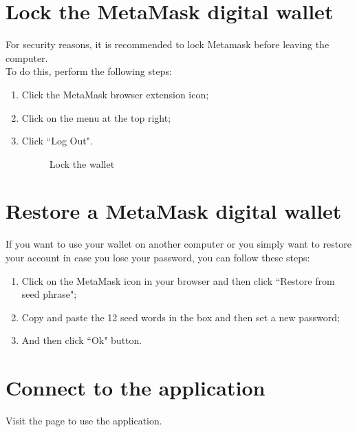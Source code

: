\documentclass[ManualeUtente]{subfiles}
\begin{document}
\section{Lock the MetaMask digital wallet}
For security reasons, it is recommended to lock Metamask before leaving the computer. \\
To do this, perform the following steps:
\begin{enumerate}
	\item Click the MetaMask browser extension icon;
	\item Click on the menu at the top right;
	\item Click \textquotedblleft Log Out".
	\begin{figure}[H]
		\centering
		\caption{Lock the wallet}
		\label{fig:Lock the wallet}
	\end{figure}
\end{enumerate}

\section{Restore a MetaMask digital wallet}
If you want to use your wallet on another computer or you simply want to restore your account in case you lose your password, you can follow these steps:
\begin{enumerate}
	\item Click on the MetaMask icon in your browser and then click \textquotedblleft Restore from seed phrase";
	\item Copy and paste the 12 seed words in the box and then set a new password;
	\item And then click \textquotedblleft Ok" button.
\end{enumerate}

\section{Connect to the application}
Visit the page  to use the application.
\end{document}
